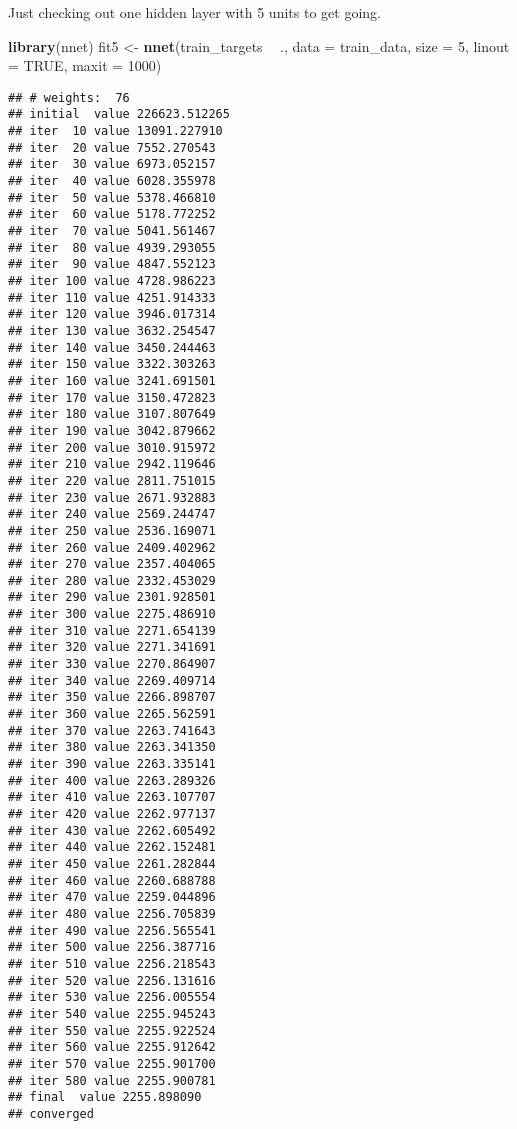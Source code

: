 \documentclass[10pt,ignorenonframetext,]{beamer}
\newenvironment{Shaded}{\begin{snugshade}}{\end{snugshade}}
\newcommand{\DataTypeTok}[1]{\textcolor[rgb]{0.13,0.29,0.53}{#1}}
\newcommand{\DecValTok}[1]{\textcolor[rgb]{0.00,0.00,0.81}{#1}}
\newcommand{\KeywordTok}[1]{\textcolor[rgb]{0.13,0.29,0.53}{\textbf{#1}}}
\newcommand{\NormalTok}[1]{#1}
\newcommand{\OperatorTok}[1]{\textcolor[rgb]{0.81,0.36,0.00}{\textbf{#1}}}
\newcommand{\OtherTok}[1]{\textcolor[rgb]{0.56,0.35,0.01}{#1}}
\newcommand{\StringTok}[1]{\textcolor[rgb]{0.31,0.60,0.02}{#1}}
\begin{document}
\begin{frame}[fragile]

Just checking out one hidden layer with 5 units to get going.

\scriptsize

\begin{Shaded}
\begin{Highlighting}[]
\KeywordTok{library}\NormalTok{(nnet)}
\NormalTok{fit5 <-}\StringTok{ }\KeywordTok{nnet}\NormalTok{(train_targets }\OperatorTok{~}\StringTok{ }\NormalTok{., }\DataTypeTok{data =}\NormalTok{ train_data, }\DataTypeTok{size =} \DecValTok{5}\NormalTok{, }\DataTypeTok{linout =} \OtherTok{TRUE}\NormalTok{, }
    \DataTypeTok{maxit =} \DecValTok{1000}\NormalTok{)}
\end{Highlighting}
\end{Shaded}

\begin{verbatim}
## # weights:  76
## initial  value 226623.512265 
## iter  10 value 13091.227910
## iter  20 value 7552.270543
## iter  30 value 6973.052157
## iter  40 value 6028.355978
## iter  50 value 5378.466810
## iter  60 value 5178.772252
## iter  70 value 5041.561467
## iter  80 value 4939.293055
## iter  90 value 4847.552123
## iter 100 value 4728.986223
## iter 110 value 4251.914333
## iter 120 value 3946.017314
## iter 130 value 3632.254547
## iter 140 value 3450.244463
## iter 150 value 3322.303263
## iter 160 value 3241.691501
## iter 170 value 3150.472823
## iter 180 value 3107.807649
## iter 190 value 3042.879662
## iter 200 value 3010.915972
## iter 210 value 2942.119646
## iter 220 value 2811.751015
## iter 230 value 2671.932883
## iter 240 value 2569.244747
## iter 250 value 2536.169071
## iter 260 value 2409.402962
## iter 270 value 2357.404065
## iter 280 value 2332.453029
## iter 290 value 2301.928501
## iter 300 value 2275.486910
## iter 310 value 2271.654139
## iter 320 value 2271.341691
## iter 330 value 2270.864907
## iter 340 value 2269.409714
## iter 350 value 2266.898707
## iter 360 value 2265.562591
## iter 370 value 2263.741643
## iter 380 value 2263.341350
## iter 390 value 2263.335141
## iter 400 value 2263.289326
## iter 410 value 2263.107707
## iter 420 value 2262.977137
## iter 430 value 2262.605492
## iter 440 value 2262.152481
## iter 450 value 2261.282844
## iter 460 value 2260.688788
## iter 470 value 2259.044896
## iter 480 value 2256.705839
## iter 490 value 2256.565541
## iter 500 value 2256.387716
## iter 510 value 2256.218543
## iter 520 value 2256.131616
## iter 530 value 2256.005554
## iter 540 value 2255.945243
## iter 550 value 2255.922524
## iter 560 value 2255.912642
## iter 570 value 2255.901700
## iter 580 value 2255.900781
## final  value 2255.898090 
## converged
\end{verbatim}


\end{frame}
\end{document}
